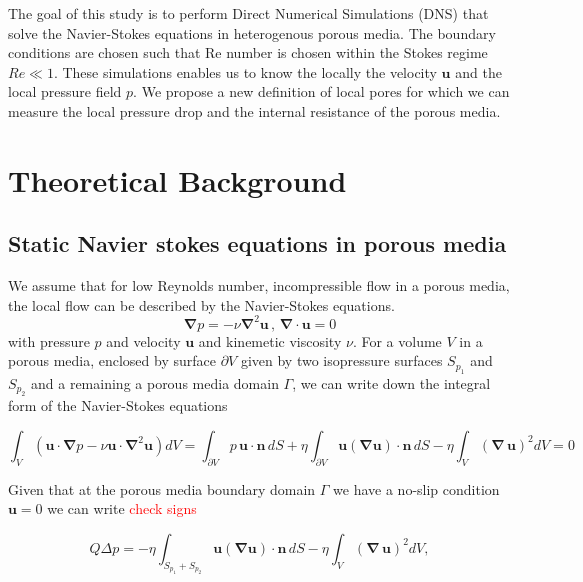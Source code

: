 \documentclass[draft]{agujournal2019}
\newcommand{\markred}[1]{\textcolor{red}{#1}}
\begin{document}
The goal of this study is to perform Direct Numerical Simulations (DNS) that solve the Navier-Stokes equations in heterogenous porous media. The boundary conditions are chosen such that Re number is chosen within the Stokes regime $Re\ll1$. These simulations enables us to know the locally the velocity $\mathbf{u}$ and the local pressure field $p$. We propose a new definition of local pores for which we can measure the local pressure drop and the internal resistance of the porous media. 



\section{Theoretical Background}
\subsection{Static Navier stokes equations in porous media}
We assume that for low Reynolds number, incompressible flow in a porous media, the local flow can be described by the Navier-Stokes equations. 
\begin{equation}\label{eq:stokes_local}
	\mathbf{\nabla} p = - \nu\mathbf{\nabla}^2 \mathbf{u}\,,\,\mathbf{\nabla}\cdot\mathbf{u}=0
	\end{equation}
with pressure $p$ and velocity $\mathbf{u}$ and kinemetic viscosity $\nu$. 
For a volume $V$ in a porous media, enclosed by surface $\partial V$ given by two isopressure surfaces $S_{p_1}$ and $S_{p_2}$ and a remaining a porous media domain $\Gamma$, we can write down the integral form of the Navier-Stokes equations


\begin{equation}\label{eq:stokes_dissipation}
\int_V \left(\mathbf{u}\cdot\mathbf{\nabla} p-\nu \mathbf{u}\cdot\mathbf{\nabla}^2 \mathbf{u}\right) dV 
= \int_{\partial V}  p\,\mathbf{u}\cdot\mathbf{n}\,dS+\eta \int_{\partial V} \mathbf{u} (\mathbf{\nabla} \mathbf{u})\cdot\mathbf{n}\,dS-\eta \int_{V} (\mathbf{\nabla}\, \mathbf{u})^2 dV=0
\end{equation}

Given that at the porous media boundary domain $\Gamma$ we have a no-slip condition $\mathbf{u}=0$ we can write \markred{check signs}

\begin{equation}\label{eq:pressuredrop}
	Q \Delta p = -\eta\int_{S_{p_1}+S_{p_2}} \mathbf{u} (\mathbf{\nabla} \mathbf{u})\cdot\mathbf{n}\,dS -\eta \int_V (\mathbf{\nabla}\, \mathbf{u})^2 dV,
\end{equation}
\end{document}
